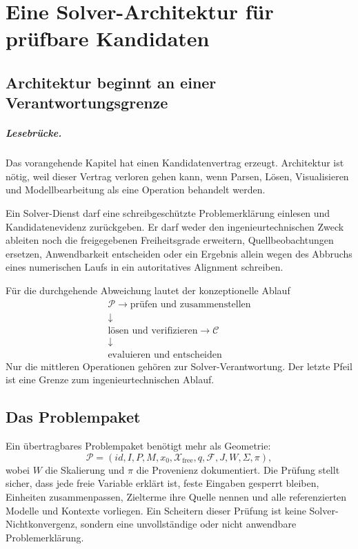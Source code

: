 \chapter{Eine Solver-Architektur für prüfbare Kandidaten}

\section{Architektur beginnt an einer Verantwortungsgrenze}

\paragraph{Lesebrücke.}
Das vorangehende Kapitel hat einen Kandidatenvertrag erzeugt. Architektur ist
nötig, weil dieser Vertrag verloren gehen kann, wenn Parsen, Lösen,
Visualisieren und Modellbearbeitung als eine Operation behandelt werden.

Ein Solver-Dienst darf eine schreibgeschützte Problemerklärung einlesen und
Kandidatenevidenz zurückgeben. Er darf weder den ingenieurtechnischen Zweck
ableiten noch die freigegebenen Freiheitsgrade erweitern, Quellbeobachtungen
ersetzen, Anwendbarkeit entscheiden oder ein Ergebnis allein wegen des
Abbruchs eines numerischen Laufs in ein autoritatives Alignment schreiben.

Für die durchgehende Abweichung lautet der konzeptionelle Ablauf
\[
\begin{array}{c}
\boxed{\mathcal P}\longrightarrow\boxed{\text{prüfen und zusammenstellen}}\\[0.4em]
\downarrow\\[-0.2em]
\boxed{\text{lösen und verifizieren}}\longrightarrow\boxed{\mathcal C}\\[0.4em]
\downarrow\\[-0.2em]
\boxed{\text{evaluieren und entscheiden}}
\end{array}
\]
Nur die mittleren Operationen gehören zur Solver-Verantwortung. Der letzte
Pfeil ist eine Grenze zum ingenieurtechnischen Ablauf.

\section{Das Problempaket}

Ein übertragbares Problempaket benötigt mehr als Geometrie:
\[
\mathcal P=
(id,I,P,M,x_0,\mathcal X_{\mathrm{free}},q,\mathcal F,
J,W,\Sigma,\pi),
\]
wobei \(W\) die Skalierung und \(\pi\) die Provenienz dokumentiert. Die
Prüfung stellt sicher, dass jede freie Variable erklärt ist, feste Eingaben
gesperrt bleiben, Einheiten zusammenpassen, Zielterme ihre Quelle nennen und
alle referenzierten Modelle und Kontexte vorliegen. Ein Scheitern dieser
Prüfung ist keine Solver-Nichtkonvergenz, sondern eine unvollständige oder
nicht anwendbare Problemerklärung.

